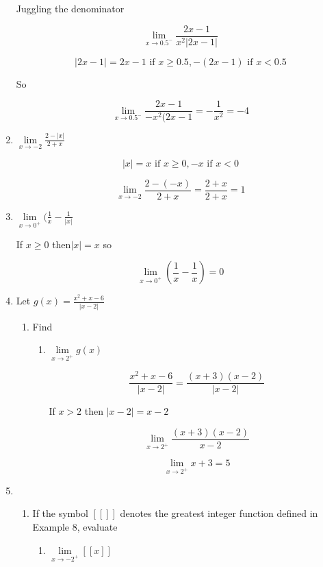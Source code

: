 \documentclass{article}
\begin{document}
\begin{enumerate}
			Juggling the denominator

			$$\lim \limits _{x \to 0.5^{-}} \frac{2x-1}{x^2|2x-1|}$$

			$$|2x-1| = 2x-1 \text{ if } x \geq 0.5, -(2x-1) \text{ if } x < 0.5$$

			So

			$$\lim \limits _{x \to 0.5^{-}} \frac{2x-1}{-x^2(2x-1} = -\frac{1}{x^2} = -4$$

		\item $\lim \limits _{x \to -2} \frac{2 - |x|}{2+x}$

			$$|x| = x \text{ if } x\geq 0, -x \text{ if } x < 0$$

			$$\lim \limits _{x \to -2} \frac{2-(-x)}{2+x} = \frac{2+x}{2+x} = 1$$

		\item $\lim \limits _{x \to 0^{+}} (\frac{1}{x} - \frac{1}{|x|}$

			If $x \geq 0$ then$|x| = x$ so

			$$\lim \limits _{x \to 0^{+}} (\frac{1}{x}-\frac{1}{x}) = 0$$

		\item Let $g(x)=\frac{x^2+x-6}{|x-2|}$

		\begin{enumerate}

			\item Find

			\begin{enumerate}
			
				\item $\lim \limits _{x \to 2^{+}} g(x)$

				$$\frac{x^2+x-6}{|x-2|} = \frac{(x+3)(x-2)}{|x-2|}$$

				If $x > 2$ then $|x-2| = x-2$

				$$\lim \limits _{x \to 2^{+}} \frac{(x+3)(x-2)}{x-2}$$

				$$\lim \limits _{x \to 2^{+}} x+3 = 5$$

			\end{enumerate}
		\end{enumerate}		

		\item

		\begin{enumerate}

			\item If the symbol $[[]]$ denotes the greatest integer function
				defined in Example 8, evaluate

			\begin{enumerate}
				\item $\lim \limits _{x \to -2^{+}} [[x]]$


\end{enumerate}
\end{enumerate}
\end{enumerate}
\end{document}
